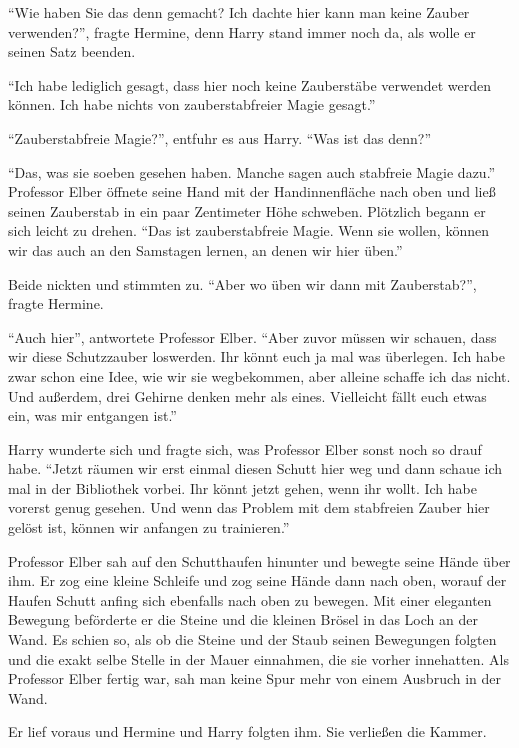 \enquote{Wie haben Sie das denn gemacht? Ich dachte hier kann man keine Zauber verwenden?}, fragte Hermine, denn Harry stand immer noch da, als wolle er seinen Satz beenden.

\enquote{Ich habe lediglich gesagt, dass hier noch keine Zauberstäbe verwendet werden können. Ich habe nichts von zauberstabfreier Magie gesagt.}

\enquote{Zauberstabfreie Magie?}, entfuhr es aus Harry. \enquote{Was ist das denn?}

\enquote{Das, was sie soeben gesehen haben. Manche sagen auch stabfreie Magie dazu.} Professor Elber öffnete seine Hand mit der Handinnenfläche nach oben und ließ seinen Zauberstab in ein paar Zentimeter Höhe schweben. Plötzlich begann er sich leicht zu drehen. \enquote{Das ist zauberstabfreie Magie. Wenn sie wollen, können wir das auch an den Samstagen lernen, an denen wir hier üben.}

Beide nickten und stimmten zu. \enquote{Aber wo üben wir dann mit Zauberstab?}, fragte Hermine.

\enquote{Auch hier}, antwortete Professor Elber. \enquote{Aber zuvor müssen wir schauen, dass wir diese Schutz\-zau\-ber loswerden. Ihr könnt euch ja mal was überlegen. Ich habe zwar schon eine Idee, wie wir sie weg\-be\-kom\-men, aber alleine schaffe ich das nicht. Und außerdem, drei Gehirne denken mehr als eines. Vielleicht fällt euch etwas ein, was mir entgangen ist.}

Harry wunderte sich und fragte sich, was Professor Elber sonst noch so drauf habe. \enquote{Jetzt räumen wir erst einmal diesen Schutt hier weg und dann schaue ich mal in der Bibliothek vorbei. Ihr könnt jetzt gehen, wenn ihr wollt. Ich habe vorerst genug gesehen. Und wenn das Problem mit dem stabfreien Zauber hier gelöst ist, können wir anfangen zu trainieren.}

Professor Elber sah auf den Schutthaufen hinunter und bewegte seine Hände über ihm. Er zog eine kleine Schleife und zog seine Hände dann nach oben, worauf der Haufen Schutt anfing sich ebenfalls nach oben zu bewegen. Mit einer eleganten Bewegung beförderte er die Steine und die kleinen Brösel in das Loch an der Wand. Es schien so, als ob die Steine und der Staub seinen Bewegungen folgten und die exakt selbe Stelle in der Mauer einnahmen, die sie vorher innehatten. Als Professor Elber fertig war, sah man keine Spur mehr von einem Ausbruch in der Wand.

Er lief voraus und Hermine und Harry folgten ihm. Sie verließen die Kammer.

